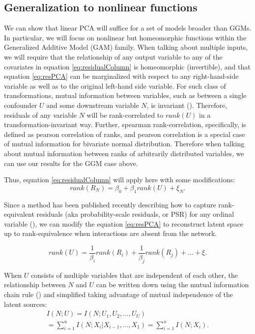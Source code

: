 \documentclass{article}
\begin{document}
\subsection{Generalization to nonlinear functions}
We can show that linear PCA will suffice for a set of models broader than GGMs.  In particular, we will focus on nonlinear but homeomorphic functions within the Generalized Additive Model (GAM) family.  When talking about multiple inputs, we will require that the relationship of any output variable to any of the covariates in equation \ref{eq:residualColumn} is homeomorphic (invertible), and that equation \ref{eq:resPCA} can be marginalized with respect to any right-hand-side variable as well as to the original left-hand side variable.  For such class of transformations, mutual information between variables, such as between a single confounder $U$ and some downstream variable $N$, is invariant (\cite{kraskov_estimating_2004}).  Therefore, residuals of any variable $N$ will be rank-correlated to $rank(U)$ in a transformation-invariant way. Further, spearman rank-correlation, specifically, is defined as pearson correlation of ranks, and pearson correlation is a special case of mutual information for bivariate normal distribution.  Therefore when talking about mutual information between ranks of arbitrarily distributed variables, we can use our results for the GGM case above.

Thus, equation \ref{eq:residualColumn} will apply here with some modifications:
\begin{equation}
rank(R_N) = \beta_0 + \beta_1 rank(U) + \xi_N.
\label{eq:residualColumnRank}
\end{equation}

Since a method has been published recently describing how to capture rank-equivalent residuals (aka probability-scale residuals, or PSR) for any ordinal variable (\cite{shepherd_probability-scale_2016}), we can modify the equation \ref{eq:resPCA} to reconstruct latent space up to rank-equivalence when interactions are absent from the network.

\begin{equation}
rank(U) = \frac{1}{\beta_i} rank(R_i) + \frac{1}{\beta_j} rank(R_j) + \dots + \xi. 
\label{resPcaGam}
\end{equation}

When $U$ consists of multiple variables that are independent of each other, the relationship between $N$ and $U$ can be written down using the mutual information chain rule (\cite{mackay_information_2003}) and simplified taking advantage of mutual independence of the latent sources:
\begin{equation}
\label{eq:rankSetRelationship}
\begin{split}
I(N; U) = I(N; U_1, U_2, \dots, U_U) \\= \sum_{i=1}^{u}{I(N; X_i | X_{i-1}, \dots, X_1)} = \sum_{i=1}^{u}{I(N; X_i)}.
\end{split}
\end{equation}
\end{document}
